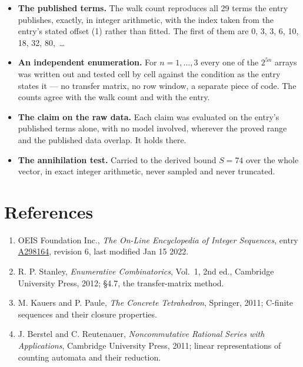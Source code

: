 \documentclass[11pt]{article}
\theoremstyle{definition}
\begin{document}
\begin{itemize}

\item {\bfseries The published terms.} The walk count reproduces all 29 terms the entry publishes, exactly, in integer arithmetic, with the index taken from the entry's stated offset (1) rather than fitted. The first of them are 0, 3, 3, 6, 10, 18, 32, 80,~\dots

\item {\bfseries An independent enumeration.} For $n = 1,\dots,3$ every one of the $2^{5n}$ arrays was written out and tested cell by cell against the condition as the entry states it --- no transfer matrix, no row window, a separate piece of code. The counts agree with the walk count and with the entry.

\item {\bfseries The claim on the raw data.} Each claim was evaluated on the entry's published terms alone, with no model involved, wherever the proved range and the published data overlap. It holds there.

\item {\bfseries The annihilation test.} Carried to the derived bound $S = 74$ over the whole vector, in exact integer arithmetic, never sampled and never truncated.

\end{itemize}

\section{References}

\begin{enumerate}

\item OEIS Foundation Inc., \emph{The On-Line Encyclopedia of Integer Sequences}, entry \href{https://oeis.org/A298164}{A298164}, revision 6, last modified Jan 15 2022.

\item R. P. Stanley, \emph{Enumerative Combinatorics}, Vol.~1, 2nd ed., Cambridge University Press, 2012; \S4.7, the transfer-matrix method.

\item M. Kauers and P. Paule, \emph{The Concrete Tetrahedron}, Springer, 2011; C-finite sequences and their closure properties.

\item J. Berstel and C. Reutenauer, \emph{Noncommutative Rational Series with Applications}, Cambridge University Press, 2011; linear representations of counting automata and their reduction.

\end{enumerate}
\end{document}
